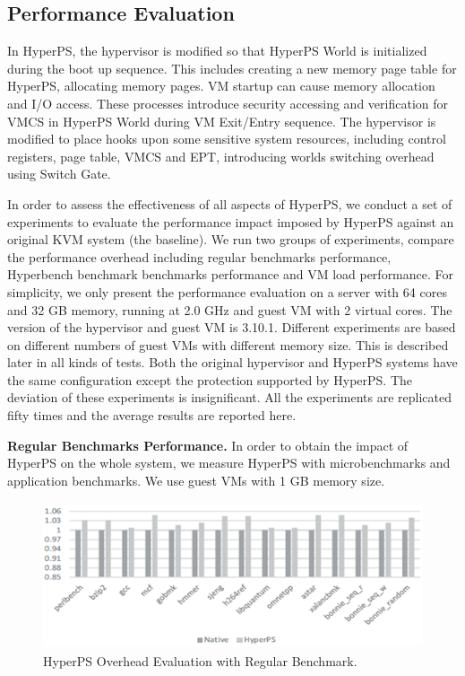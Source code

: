 \documentclass[10pt, numbers, preprint ]{sigplanconf}
\begin{document}
{\subsection{Performance Evaluation} \label{subsec:perfeva}
In HyperPS, the hypervisor is modified so that HyperPS World is initialized during the boot up sequence. This includes creating a new memory page table for HyperPS, allocating memory pages. VM startup can cause memory allocation and I/O access. These processes introduce security accessing and verification for VMCS in HyperPS World during VM Exit/Entry sequence. The hypervisor is modified to place hooks upon some sensitive system resources, including control registers, page table, VMCS and EPT, introducing worlds switching overhead using Switch Gate.

In order to assess the effectiveness of all aspects of HyperPS, we conduct a set of experiments to evaluate the performance impact imposed by HyperPS against an original KVM system (the baseline). We run two groups of experiments, compare the performance overhead including regular benchmarks performance, Hyperbench benchmark benchmarks performance  and VM load performance. For simplicity, we only present the performance evaluation on a server with 64 cores and 32 GB memory, running at 2.0 GHz and guest VM with 2 virtual cores. The version of the hypervisor and guest VM is 3.10.1. Different experiments are based on different numbers of guest VMs with different memory size. This is described later in all kinds of tests. Both the original hypervisor and HyperPS systems have the same configuration except the protection supported by HyperPS. The deviation of these experiments is insignificant. All the experiments are replicated fifty times and the average results are reported here.

\textbf{Regular Benchmarks Performance.} In order to obtain the impact of HyperPS on the whole system, we measure HyperPS with microbenchmarks and application benchmarks. We use guest VMs with 1 GB memory size.

\begin{figure}[htb]
	\centerline{\includegraphics[height=1.70in]{figures/p7.png}}
	\caption{HyperPS Overhead Evaluation with Regular Benchmark.}
	\label{fg7_perfeva}
\end{figure}

}
\end{document}
